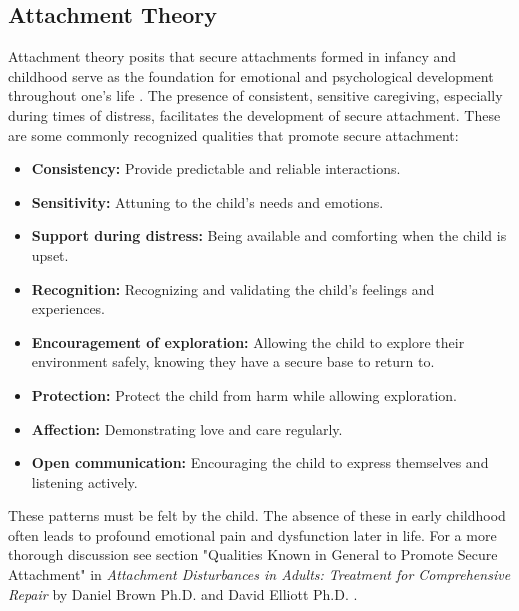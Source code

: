\documentclass[12pt,letterpaper]{article}
\begin{document}
\subsection{Attachment Theory}
\label{attachment}
Attachment theory posits that secure attachments formed in infancy and childhood serve as the foundation for emotional and psychological development throughout one's life \cite{brownAttachmentDisturbances}. The presence of consistent, sensitive caregiving, especially during times of distress, facilitates the development of secure attachment. These are some commonly recognized qualities that promote secure attachment:
\begin{itemize}
    \item \textbf{Consistency:} Provide predictable and reliable interactions.
    \item \textbf{Sensitivity:} Attuning to the child's needs and emotions.
    \item \textbf{Support during distress:} Being available and comforting when the child is upset.
    \item \textbf{Recognition:} Recognizing and validating the child's feelings and experiences.
    \item \textbf{Encouragement of exploration:} Allowing the child to explore their environment safely, knowing they have a secure base to return to.
    \item \textbf{Protection:} Protect the child from harm while allowing exploration.
    \item \textbf{Affection:} Demonstrating love and care regularly.
    \item \textbf{Open communication:} Encouraging the child to express themselves and listening actively.
\end{itemize}
These patterns must be felt by the child. The absence of these in early childhood often leads to profound emotional pain and dysfunction later in life. For a more thorough discussion see section "Qualities Known in General to Promote Secure Attachment" in \textit{Attachment Disturbances in Adults: Treatment for Comprehensive Repair} by Daniel Brown Ph.D. and David Elliott Ph.D. \cite{brownAttachmentDisturbances}.
\end{document}
